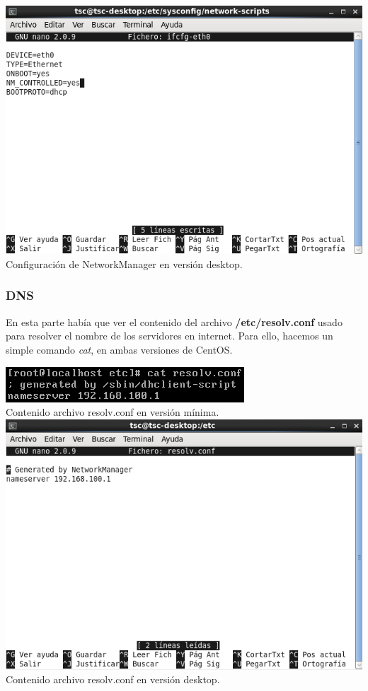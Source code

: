 \documentclass[11pt]{article}
\begin{document}
\includegraphics[width=.75\linewidth]{screenshots/desktop/ifcfg-eth0.png}
    \\Configuración de NetworkManager en versión desktop.\\

\subsubsection{DNS}
	En esta parte había que ver el contenido del archivo \textbf{/etc/resolv.conf} usado para resolver el nombre de los servidores en internet. Para ello, hacemos un simple comando \textit{cat}, en ambas versiones de CentOS.
	
\includegraphics[width=.75\linewidth]{screenshots/minimal/cat-resolv-conf.png}
    \\Contenido archivo resolv.conf en versión mínima.\\

\includegraphics[width=.75\linewidth]{screenshots/desktop/resolv-conf.png}
    \\Contenido archivo resolv.conf en versión desktop.\\
	
\end{document}
